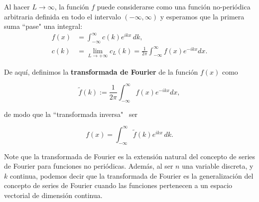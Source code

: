 Al hacer $L \to \infty$, la función $f$ puede considerarse como una
función no-periódica arbitraria definida en todo el intervalo $(-\infty, \infty)$ y  esperamos que la primera suma ``pase"   una integral:
\begin{align*}
    f(x)&= \int_{-\infty}^{\infty} c(k) e^{ikx} \,dk, \\
  c(k) &= \lim_{L\to + \infty} c_L(k) =  \frac{1}{2\pi}  \int_{-\infty}^{\infty} f(x) e^{-ikx} dx.
\end{align*}

De aquí, definimos la \textbf{transformada de Fourier} de la función $f(x)$ como 
\begin{shaded}
  \begin{equation}
 \tilde{f}(k) := \frac{1}{2\pi} \int_{-\infty}^{\infty} f(x) e^{-ikx} dx \label{T.Fourier},
\end{equation}  
\end{shaded}

de modo que la ``transformada inversa" \,  ser
\begin{shaded}
  \begin{equation}
 f(x) =  \int_{-\infty}^{\infty} \tilde{f}(k) e^{ikx} \,dk. \label{I.Fourier}
\end{equation}  
\end{shaded}

 Note que la transformada de Fourier es la extensión natural del concepto de series de Fourier para funciones no periódicas. Además, al ser $n$ una variable discreta, y $k$ continua, podemos decir que la transformada de Fourier es la generalización del concepto de series de Fourier cuando las funciones pertenecen a un espacio vectorial de dimensión continua.

